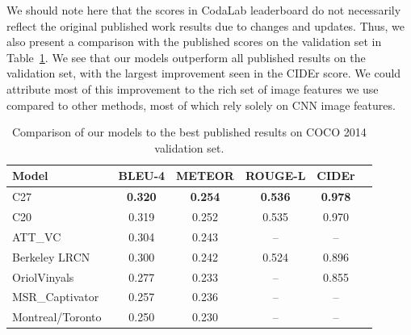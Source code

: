 We should note here that the scores in CodaLab leaderboard do not necessarily
reflect the original published work results due to changes and updates.
Thus, we also present a comparison with the published scores on the validation
set in Table~\ref{tab:resCocPubVal}.
We see that our models outperform all published results on the validation set,
with the largest improvement seen in the CIDEr score.
We could attribute most of this improvement to the rich set of image features we
use compared to other methods, most of which rely solely on CNN image features.
\begin{table}[tbh]
  \centering
  \begin{adjustbox}{center}
  \begin{tabular}{|l|c|c|c|c|c|}
    \hline\hline
    \bf Model  &BLEU-4 &METEOR &ROUGE-L&CIDEr\\\hline
    C27 & \bf0.320&\bf0.254 &\bf0.536 &\bf0.978 \\
    C20 & 0.319 & 0.252 & 0.535 & 0.970 \\\hline
    ATT\_VC~\cite{you2016image} & 0.304& 0.243& -- & -- \\
    Berkeley LRCN~\cite{donahue2015long} & 0.300& 0.242& 0.524 & 0.896 \\
    OriolVinyals~\cite{Vinyals_2015_CVPR} & 0.277& 0.233& -- & 0.855 \\
    MSR\_Captivator~\cite{Fang2015} & 0.257& 0.236& -- & -- \\
    Montreal/Toronto~\cite{Xu2015show} & 0.250& 0.230& -- & -- \\
    \hline \hline
  \end{tabular}
  \end{adjustbox}
  \caption{Comparison of our models to the best published results on COCO 2014 validation set.}
  \label{tab:resCocPubVal}
\end{table}


